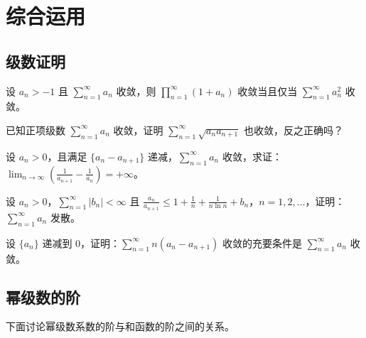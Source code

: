 \documentclass[lang=cn,10pt,thmcnt=section]{elegantbook}
\begin{document}
\section{综合运用}
\subsection{级数证明}
\begin{example}
	设 $a_n > -1$ 且 $\sum_{n=1}^{\infty} a_n$ 收敛，则 $\prod_{n=1}^{\infty} (1 + a_n)$ 收敛当且仅当 $\sum_{n=1}^{\infty} a_n^2$ 收敛。
	\end{example}
	
	\begin{example}
	已知正项级数 $\sum_{n=1}^{\infty} a_n$ 收敛，证明 $\sum_{n=1}^{\infty} \sqrt{a_n a_{n+1}}$ 也收敛，反之正确吗？
	\end{example}
	
	\begin{example}
	设 $a_n > 0$，且满足 $\{a_n - a_{n+1}\}$ 递减，$\sum_{n=1}^{\infty} a_n$ 收敛，求证：$\lim_{n \to \infty} \left( \frac{1}{a_{n+1}} - \frac{1}{a_n} \right) = +\infty$。
	\end{example}
	
	\begin{example}
	设 $a_n > 0$，$\sum_{n=1}^{\infty} |b_n| < \infty$ 且 $\frac{a_n}{a_{n+1}} \leq 1 + \frac{1}{n} + \frac{1}{n \ln n} + b_n$，$n = 1, 2, \ldots$，证明：$\sum_{n=1}^{\infty} a_n$ 发散。
	\end{example}
	
	\begin{example}
	设 $\{a_n\}$ 递减到 0，证明：$\sum_{n=1}^{\infty} n(a_n - a_{n+1})$ 收敛的充要条件是 $\sum_{n=1}^{\infty} a_n$ 收敛。
	\end{example}
\subsection{幂级数的阶}
下面讨论幂级数系数的阶与和函数的阶之间的关系。
\end{document}
